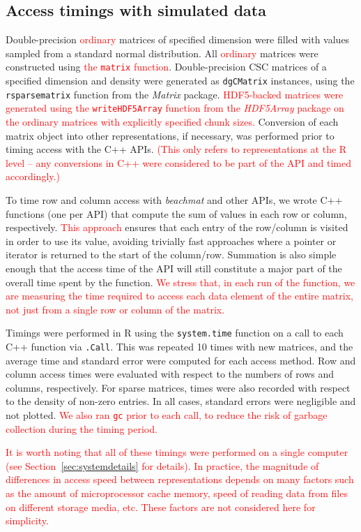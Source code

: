 \documentclass{article}
\newcommand{\beachmat}{\textit{beachmat}}
\newcommand{\code}[1]{\texttt{#1}}
\newcommand{\revised}[1]{\textcolor{red}{#1}}
\begin{document}
\subsection{Access timings with simulated data}
Double-precision \revised{ordinary} matrices of specified dimension were filled with values sampled from a standard normal distribution.
All \revised{ordinary} matrices were constructed using \revised{the \code{matrix} function}.
Double-precision CSC matrices of a specified dimension and density were generated as \code{dgCMatrix} instances, using the \code{rsparsematrix} function from the \textit{Matrix} package.
\revised{HDF5-backed matrices were generated using the \code{writeHDF5Array} function from the \textit{HDF5Array} package on the ordinary matrices with explicitly specified chunk sizes.}
Conversion of each matrix object into other representations, if necessary, was performed prior to timing access with the C++ APIs.
\revised{(This only refers to representations at the R level -- any conversions in C++ were considered to be part of the API and timed accordingly.)}

To time row and column access with \beachmat{} and other APIs, we wrote C++ functions (one per API) that compute the sum of values in each row or column, respectively.
\revised{This approach} ensures that each entry of the row/column is visited in order to use its value, avoiding trivially fast approaches where a pointer or iterator is returned to the start of the column/row.
Summation is also simple enough that the access time of the API will still constitute a major part of the overall time spent by the function.
\revised{We stress that, in each run of the function, we are measuring the time required to access each data element of the entire matrix, not just from a single row or column of the matrix.}

Timings were performed in R using the \code{system.time} function on a call to each C++ function via \code{.Call}. 
This was repeated 10 times with new matrices, and the average time and standard error were computed for each access method. 
Row and column access times were evaluated with respect to the numbers of rows and columns, respectively.
For sparse matrices, times were also recorded with respect to the density of non-zero entries.
In all cases, standard errors were negligible and not plotted.
\revised{We also ran \code{gc} prior to each call, to reduce the risk of garbage collection during the timing period.}

\revised{It is worth noting that all of these timings were performed on a single computer (see Section~\ref{sec:systemdetails} for details). 
In practice, the magnitude of differences in access speed between representations depends on many factors such as the amount of microprocessor cache memory, speed of reading data from files on different storage media, etc.
These factors are not considered here for simplicity.}
\end{document}
